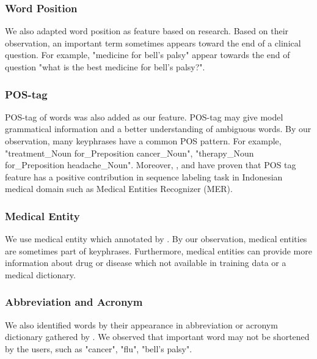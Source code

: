 \subsubsection{Word Position\\}
We also adapted word position as feature based on \cite{cao2010automatically}research. Based on their observation, an important term sometimes appears toward the end of a clinical question. For example, "medicine for bell's palsy" appear towards the end of question "what is the best medicine for bell's palsy?". 

\subsubsection{POS-tag\\}
POS-tag of words was also added as our feature. POS-tag may give model grammatical information and a better understanding of ambiguous words. By our observation, many keyphrases have a common POS pattern. For example, "treatment\_Noun for\_Preposition cancer\_Noun", "therapy\_Noun for\_Preposition headache\_Noun". Moreover, \cite{skripsiWahid}, and \cite{abacha2011medical} have proven that POS tag feature has a positive contribution in sequence labeling task in Indonesian medical domain such as Medical Entities Recognizer (MER).

\subsubsection{Medical Entity\\}
We use medical entity which annotated by \cite{skripsiWahid}. By our observation, medical entities are sometimes part of keyphrases. Furthermore, medical entities can provide more information about drug or disease which not available in training data or a medical dictionary.

\subsubsection{Abbreviation and Acronym\\}
We also identified words by their appearance in abbreviation or acronym dictionary gathered by \cite{skripsiKakAbid}. We observed that important word may not be shortened by the users, such as "cancer", "flu", "bell’s palsy".

